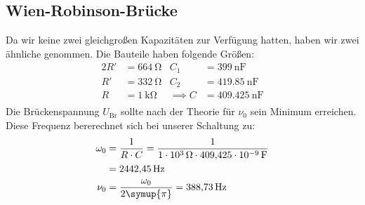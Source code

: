 \subsection{Wien-Robinson-Brücke}
Da wir keine zwei gleichgroßen Kapazitäten zur Verfügung hatten, haben wir zwei ähnliche genommen.
Die Bauteile haben folgende Größen:
\begin{align*}
  2R' &= \SI{664}{\ohm} & C_1 &= \SI{399}{\nano\farad}\\
  R' &= \SI{332}{\ohm} & C_2 &= \SI{419.85}{\nano\farad}\\
  R &= \SI{1}{\kilo\ohm} & \implies C &= \SI{409.425}{\nano\farad}\\
\end{align*}
Die Brückenspannung $U_{\text{Br}}$ sollte nach der Theorie für $\nu_0$ sein Minimum erreichen.
Diese Frequenz bererechnet sich bei unserer Schaltung zu:
\begin{align*}
  \omega_0 &= \frac{1}{R\cdot C} = \frac{1}{\SI{1e3}{\ohm} \cdot \SI{409.425e-9}{\farad}} \\
 &= \SI{2442.45}{\hertz}\\
 \nu_0 &= \frac{\omega_0}{2\symup{\pi}} = \SI{388.73}{\hertz}
\end{align*}

